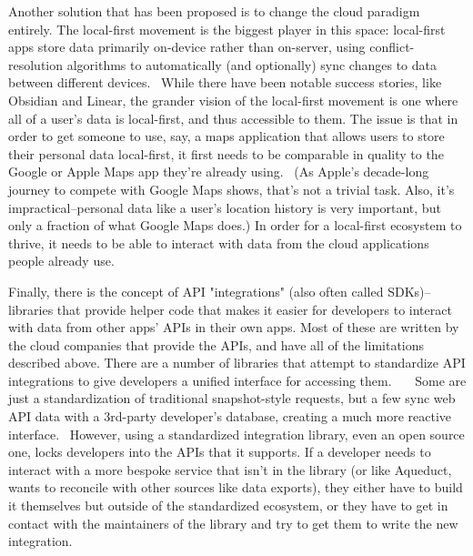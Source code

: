 \documentclass[manuscript,review,anonymous]{acmart}
\begin{document}
Another solution that has been proposed is to change the cloud paradigm entirely. The local-first movement is the biggest player in this space: local-first apps store data primarily on-device rather than on-server, using conflict-resolution algorithms to automatically (and optionally) sync changes to data between different devices.~\cite{kleppmannLocalfirstSoftwareYou2019} While there have been notable success stories, like Obsidian and Linear, the grander vision of the local-first movement is one where all of a user's data is local-first, and thus accessible to them. The issue is that in order to get someone to use, say, a maps application that allows users to store their personal data local-first, it first needs to be comparable in quality to the Google or Apple Maps app they're already using.~\cite{syrmoudisDataPortabilityOnline2021} (As Apple's decade-long journey to compete with Google Maps shows, that's not a trivial task. Also, it's impractical--personal data like a user's location history is very important, but only a fraction of what Google Maps does.) In order for a local-first ecosystem to thrive, it needs to be able to interact with data from the cloud applications people already use.

Finally, there is the concept of API "integrations" (also often called SDKs)--libraries that provide helper code that makes it easier for developers to interact with data from other apps' APIs in their own apps. Most of these are written by the cloud companies that provide the APIs, and have all of the limitations described above. There are a number of libraries that attempt to standardize API integrations to give developers a unified interface for accessing them.~\cite{SurferOrgProtocol2025}~\cite{Mainframe}~\cite{Nango} Some are just a standardization of traditional snapshot-style requests, but a few sync web API data with a 3rd-party developer's database, creating a much more reactive interface.~\cite{Sequin} However, using a standardized integration library, even an open source one, locks developers into the APIs that it supports. If a developer needs to interact with a more bespoke service that isn't in the library (or like Aqueduct, wants to reconcile with other sources like data exports), they either have to build it themselves but outside of the standardized ecosystem, or they have to get in contact with the maintainers of the library and try to get them to write the new integration. 
\end{document}

